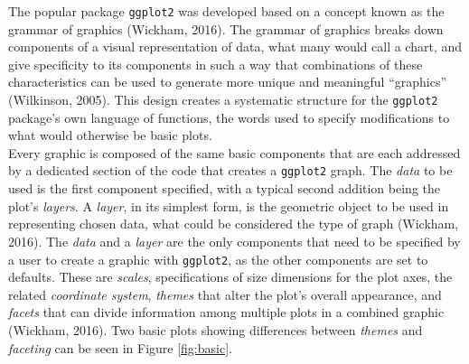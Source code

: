 \documentclass[english,man,floatsintext]{apa6}
\newenvironment{Shaded}{\begin{snugshade}}{\end{snugshade}}
\newcommand{\DataTypeTok}[1]{\textcolor[rgb]{0.13,0.29,0.53}{#1}}
\newcommand{\KeywordTok}[1]{\textcolor[rgb]{0.13,0.29,0.53}{\textbf{#1}}}
\newcommand{\NormalTok}[1]{#1}
\newcommand{\OperatorTok}[1]{\textcolor[rgb]{0.81,0.36,0.00}{\textbf{#1}}}
\newcommand{\StringTok}[1]{\textcolor[rgb]{0.31,0.60,0.02}{#1}}
\begin{document}
The popular package \texttt{ggplot2} was developed based on a concept known as the grammar of graphics (Wickham, 2016). The grammar of graphics breaks down components of a visual representation of data, what many would call a chart, and give specificity to its components in such a way that combinations of these characteristics can be used to generate more unique and meaningful \enquote{graphics} (Wilkinson, 2005). This design creates a systematic structure for the \texttt{ggplot2} package's own language of functions, the words used to specify modifications to what would otherwise be basic plots.\\
Every graphic is composed of the same basic components that are each addressed by a dedicated section of the code that creates a \texttt{ggplot2} graph. The \emph{data} to be used is the first component specified, with a typical second addition being the plot's \emph{layers}. A \emph{layer}, in its simplest form, is the geometric object to be used in representing chosen data, what could be considered the type of graph (Wickham, 2016). The \emph{data} and a \emph{layer} are the only components that need to be specified by a user to create a graphic with \texttt{ggplot2}, as the other components are set to defaults. These are \emph{scales}, specifications of size dimensions for the plot axes, the related \emph{coordinate system}, \emph{themes} that alter the plot's overall appearance, and \emph{facets} that can divide information among multiple plots in a combined graphic (Wickham, 2016). Two basic plots showing differences between \emph{themes} and \emph{faceting} can be seen in Figure \ref{fig:basic}.

\begin{Shaded}
\end{Shaded}
\end{document}

